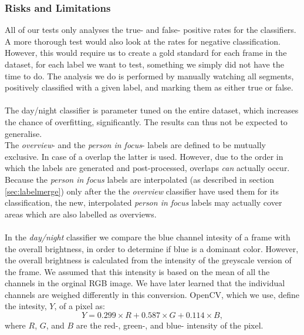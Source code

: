 \subsubsection{Risks and Limitations}
%
All of our tests only analyses the true- and false- positive rates for the classifiers. A more thorough test would also look at the rates for negative classification. However, this would require us to create a gold standard for each frame in the dataset, for each label we want to test, something we simply did not have the time to do. The analysis we do is performed by manually watching all segments, positively classified with a given label, and marking them as either true or false.\\
\\
The day/night classifier is parameter tuned on the entire dataset, which increases the chance of overfitting, significantly. The results can thus not be expected to generalise.
\\
The \textit{overview}- and the \textit{person in focus}- labels are defined to be mutually exclusive. In case of a overlap the latter is used. However, due to the order in which the labels are generated and post-processed, overlaps \textit{can} actually occur. Because the \textit{person in focus} labels are interpolated (as described in section \ref{sec:labelmerge}) only after the the \textit{overview} classifier have used them for its classification, the new, interpolated \textit{person in focus} labels may actually cover areas which are also labelled as overviews.\\
\\
In the \textit{day/night} classifier we compare the blue channel intesity of a frame with the overall brightness, in order to determine if blue is a dominant color. However, the overall brightness is calculated from the intensity of the greyscale version of the frame. We assumed that this intensity is based on the mean of all the channels in the orginal RGB image. We have later learned that the individual channels are weighed differently in this conversion. OpenCV, which we use, define the intesity, $Y$, of a pixel as:
%
\[
Y = 0.299 \times R + 0.587 \times  G + 0.114 \times B,
\]
%
where $R$, $G$, and $B$ are the red-, green-, and blue- intensity of the pixel.\\
%
